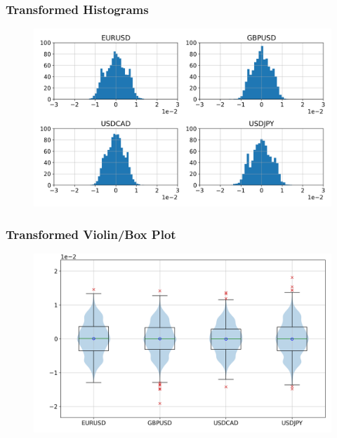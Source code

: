 \documentclass{beamer}
\begin{document}
\begin{frame}
    \frametitle{Transformed Histograms}
    \begin{figure}
        \includegraphics[width=1\linewidth]{data_analysis/histograms_transformed.png}
    \end{figure}
\end{frame}

\begin{frame}
    \frametitle{Transformed Violin/Box Plot}
    \begin{figure}
        \includegraphics[width=1\linewidth]{data_analysis/violin_transformed.png}
    \end{figure}
\end{frame}
\end{document}
